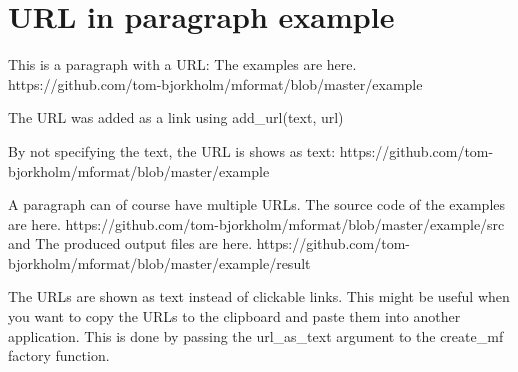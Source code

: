 \documentclass[a4paper]{report}
\begin{document}
\chapter{URL in paragraph example}

This is a paragraph with a URL: The examples are here. https://github.com/tom-bjorkholm/mformat/blob/master/example

The URL was added as a link using add\_url(text, url)

By not specifying the text, the URL is shows as text: https://github.com/tom-bjorkholm/mformat/blob/master/example

A paragraph can of course have multiple URLs. The source code of the examples are here. https://github.com/tom-bjorkholm/mformat/blob/master/example/src and The produced output files are here. https://github.com/tom-bjorkholm/mformat/blob/master/example/result

The URLs are shown as text instead of clickable links. This might be useful when you want to copy the URLs to the clipboard and paste them into another application. This is done by passing the url\_as\_text argument to the create\_mf factory function.
\end{document}
